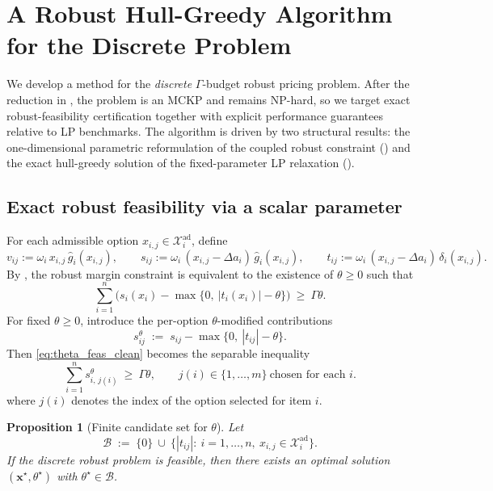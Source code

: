 \documentclass[11pt, a4paper]{article}
\theoremstyle{plain}
\newtheorem{proposition}[proposition]{Proposition}
\theoremstyle{definition}
\theoremstyle{remark}
\begin{document}
\section{A Robust Hull-Greedy Algorithm for the Discrete Problem}\label{sec:algorithm}

We develop a method for the \emph{discrete} $\Gamma$-budget robust pricing problem. After the reduction in , the
problem is an MCKP and remains NP-hard, so we target exact robust-feasibility certification together with explicit performance guarantees relative to LP benchmarks.
The algorithm is driven by two structural results: the one-dimensional parametric reformulation of the coupled robust constraint
() and the exact hull-greedy solution of the fixed-parameter LP relaxation ().

\subsection{Exact robust feasibility via a scalar parameter}\label{subsec:theta}

For each admissible option $x_{i,j}\in\mathcal X_i^{\mathrm{ad}}$, define
\[
v_{ij}:=\omega_i\,x_{i,j}\,\hat g_i(x_{i,j}),\qquad
s_{ij}:=\omega_i\,(x_{i,j}-\Delta a_i)\,\hat g_i(x_{i,j}),\qquad
t_{ij}:=\omega_i\,(x_{i,j}-\Delta a_i)\,\delta_i(x_{i,j}).
\]
By , the robust margin constraint is equivalent to the existence of $\theta\ge 0$ such that
\begin{equation}\label{eq:theta_feas_clean}
\sum_{i=1}^n\Big(s_i(x_i)-\max\{0,\ |t_i(x_i)|-\theta\}\Big)\ \ge\ \Gamma\theta.
\end{equation}
For fixed $\theta\ge 0$, introduce the per-option $\theta$-modified contributions
\begin{equation}\label{eq:s_theta_def_clean}
s^\theta_{ij}\;:=\;s_{ij}-\max\{0,\ |t_{ij}|-\theta\}.
\end{equation}
Then \eqref{eq:theta_feas_clean} becomes the separable inequality
\begin{equation}\label{eq:theta_margin_clean}
\sum_{i=1}^n s^\theta_{i,\,j(i)}\ \ge\ \Gamma\theta,
\qquad j(i)\in\{1,\dots,m\}\ \text{chosen for each }i.
\end{equation}
\noindent where $j(i)$ denotes the index of the option selected for item $i$.

\begin{proposition}[Finite candidate set for \texorpdfstring{$\theta$}{theta}]\label{prop:theta_candidates_discrete_clean}
Let
\[
\mathcal B\;:=\;\{0\}\ \cup\ \{|t_{ij}|:\ i=1,\dots,n,\ x_{i,j}\in\mathcal X_i^{\mathrm{ad}}\}.
\]
If the discrete robust problem is feasible, then there exists an optimal solution $(\bm x^\star,\theta^\star)$ with $\theta^\star\in\mathcal B$.
\end{proposition}
\end{document}
